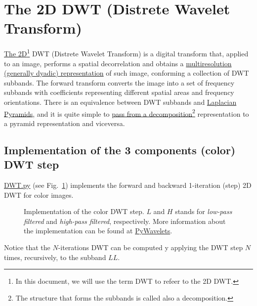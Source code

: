 \section{The 2D DWT (Distrete Wavelet Transform)}
\href{https://vicente-gonzalez-ruiz.github.io/image_transformations_for_coding/#x1-3100020}{The
  2D\footnote{In this document, we will use the term DWT to refeer to
    the 2D DWT.} DWT (Distrete Wavelet Transform)} is a digital
transform that, applied to an image, performs a spatial decorrelation
and obtains a
\href{https://vicente-gonzalez-ruiz.github.io/image_transformations_for_coding/index.html#x1-3500024}{multiresolution
  (generally dyadic) representation} of such image, conforming a
collection of DWT subbands. The forward transform converts the image
into a set of frequency subbands with coefficients representing
different spatial areas and frequency orientations. There is an
equivalence between DWT subbands and
\href{http://fourier.eng.hmc.edu/e161/lectures/canny/node3.html}{Laplacian
  Pyramids}, and it is quite simple to
\href{https://nbviewer.jupyter.org/github/vicente-gonzalez-ruiz/pyramids-and-wavelets/index.ipynb}{pass
  from a decomposition\footnote{The structure that forms the subbands
    is called also a decomposition.} representation to a pyramid
  representation and viceversa}.

\subsection{Implementation of the 3 components (color) DWT step}
\href{https://github.com/vicente-gonzalez-ruiz/MCDWT/blob/master/src/DWT.py}{DWT.py}
(see Fig.~\ref{fig:DWT}) implements the forward and backward
1-iteration (step) 2D DWT for color images.

\begin{figure}

\caption{Implementation of the color DWT step. $L$ and $H$ stands for
  \emph{low-pass filtered} and \emph{high-pass filtered},
  respectively.  More information about the implementation can be
  found at
  \href{https://pywavelets.readthedocs.io/en/latest/index.html}{PyWavelets}.}
\label{fig:DWT}
\end{figure}

Notice that the $N$-iterations DWT can be computed y applying the DWT
step $N$ times, recursively, to the subband $LL$.

